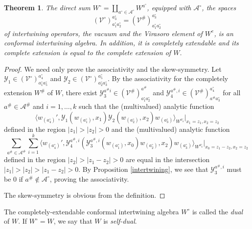 \documentclass{amsproc}
\newtheorem{thm}{Theorem}[section]
\theoremstyle{definition}
\theoremstyle{remark}
\numberwithin{equation}{section}
\begin{document}
\begin{thm}
The direct sum $W^{\circ}=\coprod_{a^{\circ}\in \mathcal{A}^{\circ}}
W^{a^{\circ}}$, equipped with $\mathcal{A}^{\circ}$, 
the spaces 
$$(\mathcal{V}^{\circ})_{a_{1}^{\circ}a_{2}^{\circ}}^{a_{3}^{\circ}}=
(\mathcal{V}^{\#})_{a_{1}^{\circ}a_{2}^{\circ}}^{a_{3}^{\circ}}$$
of intertwining operators,
the vacuum and the Virasoro element of $W^{e}$, is an 
conformal intertwining algebra. In addition, it is completely extendable 
and its complete extension is equal to the complete extension of 
$W$. 
\end{thm}
\begin{proof}
We need only prove the associativity and the skew-symmetry. Let 
$\mathcal{Y}_{1}\in (\mathcal{
V}^{\circ})_{a^{\circ}_{1}a^{\circ}_{5}}^{a^{\circ}_{4}}$ 
and $\mathcal{Y}_{2}\in(\mathcal{
V}^{\circ})_{a^{\circ}_{2}a^{\circ}_{3}}^{a^{\circ}_{5}}$. 
By the associativity for the completely extension $W^{\#}$ of $W$,
there exist $\mathcal{Y}^{a^{\#} i}_{3}
\in (\mathcal{V}^{\#})_{a^{\circ}_{1}a^{\circ}_{2}}^{a^{\#}}$ 
and $\mathcal{Y}^{a^{\#},i}_{4}\in 
(\mathcal{V}^{\#})_{a^{\#}a^{\circ}_{3}}^{a^{\circ}_{4}}$ for all $a^{\#}\in 
\mathcal{A}^{\#}$ and $i=1, \dots, k$
such that the (multivalued) analytic function 
$$
\langle w_{(a^{\circ}_{4})}', 
\mathcal{Y}_{1}(w_{(a^{\circ}_{1})}, x_{1})\mathcal{Y}_{2}(w_{(a^{\circ}_{2})}, 
x_{2})w_{(a^{\circ}_{3})}\rangle_{W^{a_{4}^{\circ}}}|_{x_{1}=z_{1},
x_{2}=z_{2}}
$$
defined in the region
$|z_{1}|>|z_{2}|>0$ 
and the (multivalued) analytic function
\begin{equation}\label{iter2}
\sum_{a^{\#}\in \mathcal{A}^{\#}}\sum_{i=1}^{k}
\langle w_{(a^{\circ}_{4})}', \mathcal{Y}^{a^{\#}, i}_{4}
(\mathcal{Y}^{a^{\#}, i}_{3}(w_{(a^{\circ}_{1})},
x_{0})w_{(a^{\circ}_{2})}, x_{2})w_{(a^{\circ}_{3})}
\rangle_{W^{a^{\circ}_{4}}}
|_{x_{0}=z_{1}-z_{2},
x_{2}=z_{2}}
\end{equation}
defined in the region
$|z_{2}|>|z_{1}-z_{2}|>0$ are equal in the intersection
$|z_{1}|> |z_{2}|>|z_{1}-z_{2}|>0$.
By Proposition \ref{intertwining}, we see that 
$\mathcal{Y}^{a^{\#}, i}_{3}$ 
must be $0$ if $a^{\#}\not \in \mathcal{A}^{\circ}$, proving the 
associativity. 

The skew-symmetry is obvious from the definition.
\end{proof}

The completely-extendable conformal intertwining algebra
$W^{\circ}$ is called the {\it dual} of $W$. If $W^{\circ}=W$,
we say that $W$ is {\it self-dual}.
\end{document}
